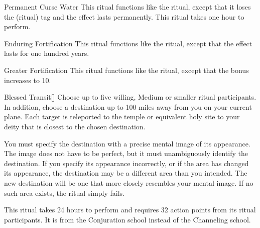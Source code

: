 \lowercase{\hypertarget{spell:Permanent Curse Water}{}}\label{spell:Permanent Curse Water}
\begin{ability}[\nth{2}]{\hypertarget{spell:Permanent Curse Water}{Permanent Curse Water}}
This ritual functions like the  ritual, except that it loses the  (ritual) tag and the effect lasts permanently.
This ritual takes one hour to perform.
\end{ability}
\vspace{0.25em}



\lowercase{\hypertarget{spell:Enduring Fortification}{}}\label{spell:Enduring Fortification}
\begin{ability}[\nth{3}]{\hypertarget{spell:Enduring Fortification}{Enduring Fortification}}
This ritual functions like the  ritual, except that the effect lasts for one hundred years.
\end{ability}
\vspace{0.25em}



\lowercase{\hypertarget{spell:Greater Fortification}{}}\label{spell:Greater Fortification}
\begin{ability}[\nth{3}]{\hypertarget{spell:Greater Fortification}{Greater Fortification}}
This ritual functions like the  ritual, except that the  bonus increases to 10.
\end{ability}
\vspace{0.25em}



\lowercase{\hypertarget{spell:Blessed Transit}{}}\label{spell:Blessed Transit}
\begin{ability}[\nth{4}]{\hypertarget{spell:Blessed Transit}{Blessed Transit}}[]
Choose up to five willing, Medium or smaller ritual participants.
In addition, choose a destination up to 100 miles away from you on your current plane.
Each target is teleported to the temple or equivalent holy site to your deity that is closest to the chosen destination.

You must specify the destination with a precise mental image of its appearance.
The image does not have to be perfect, but it must unambiguously identify the destination.
If you specify its appearance incorrectly, or if the area has changed its appearance, the destination may be a different area than you intended.
The new destination will be one that more closely resembles your mental image.
If no such area exists, the ritual simply fails.

This ritual takes 24 hours to perform and requires 32 action points from its ritual participants.
It is from the Conjuration school instead of the Channeling school.
\end{ability}
\vspace{0.25em}



